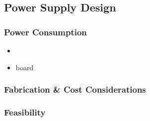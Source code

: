 \subsection{Power Supply Design}
\subsubsection{Power Consumption}
	\begin{itemize}
		\item \olimex
		\item \atmega board
	\end{itemize}
\subsubsection{Fabrication \& Cost Considerations}
\subsubsection{Feasibility}
